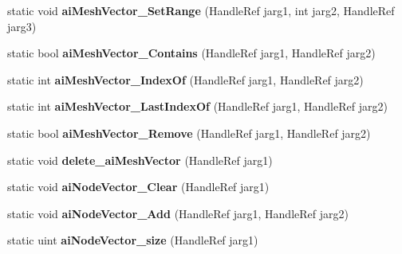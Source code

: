 \begin{DoxyCompactItemize}
\item 
\hypertarget{class_assimp_p_i_n_v_o_k_e_a4acc6b87796b37bf603a8b1507bd0439}{static void {\bfseries ai\+Mesh\+Vector\+\_\+\+Set\+Range} (Handle\+Ref jarg1, int jarg2, Handle\+Ref jarg3)}\label{class_assimp_p_i_n_v_o_k_e_a4acc6b87796b37bf603a8b1507bd0439}

\item 
\hypertarget{class_assimp_p_i_n_v_o_k_e_a78a77d067e3e69d033a8d430af031bdb}{static bool {\bfseries ai\+Mesh\+Vector\+\_\+\+Contains} (Handle\+Ref jarg1, Handle\+Ref jarg2)}\label{class_assimp_p_i_n_v_o_k_e_a78a77d067e3e69d033a8d430af031bdb}

\item 
\hypertarget{class_assimp_p_i_n_v_o_k_e_aa8ab6422759f0dc4b9a37b25d41d4179}{static int {\bfseries ai\+Mesh\+Vector\+\_\+\+Index\+Of} (Handle\+Ref jarg1, Handle\+Ref jarg2)}\label{class_assimp_p_i_n_v_o_k_e_aa8ab6422759f0dc4b9a37b25d41d4179}

\item 
\hypertarget{class_assimp_p_i_n_v_o_k_e_a1d3206a5d3831c41ed37ce8b9efac9d1}{static int {\bfseries ai\+Mesh\+Vector\+\_\+\+Last\+Index\+Of} (Handle\+Ref jarg1, Handle\+Ref jarg2)}\label{class_assimp_p_i_n_v_o_k_e_a1d3206a5d3831c41ed37ce8b9efac9d1}

\item 
\hypertarget{class_assimp_p_i_n_v_o_k_e_a4f0dbdf3f7282d5f5b133b6bd66fb472}{static bool {\bfseries ai\+Mesh\+Vector\+\_\+\+Remove} (Handle\+Ref jarg1, Handle\+Ref jarg2)}\label{class_assimp_p_i_n_v_o_k_e_a4f0dbdf3f7282d5f5b133b6bd66fb472}

\item 
\hypertarget{class_assimp_p_i_n_v_o_k_e_a85162c58f03974acf31568469dcd466a}{static void {\bfseries delete\+\_\+ai\+Mesh\+Vector} (Handle\+Ref jarg1)}\label{class_assimp_p_i_n_v_o_k_e_a85162c58f03974acf31568469dcd466a}

\item 
\hypertarget{class_assimp_p_i_n_v_o_k_e_a2639aa0a887d72b5fab253bcf7aba814}{static void {\bfseries ai\+Node\+Vector\+\_\+\+Clear} (Handle\+Ref jarg1)}\label{class_assimp_p_i_n_v_o_k_e_a2639aa0a887d72b5fab253bcf7aba814}

\item 
\hypertarget{class_assimp_p_i_n_v_o_k_e_aead06b2f2b01261926f214c070ca06e5}{static void {\bfseries ai\+Node\+Vector\+\_\+\+Add} (Handle\+Ref jarg1, Handle\+Ref jarg2)}\label{class_assimp_p_i_n_v_o_k_e_aead06b2f2b01261926f214c070ca06e5}

\item 
\hypertarget{class_assimp_p_i_n_v_o_k_e_aa75b3c458092d3612f2a6974c0e6dd31}{static uint {\bfseries ai\+Node\+Vector\+\_\+size} (Handle\+Ref jarg1)}\label{class_assimp_p_i_n_v_o_k_e_aa75b3c458092d3612f2a6974c0e6dd31}


\end{DoxyCompactItemize}
